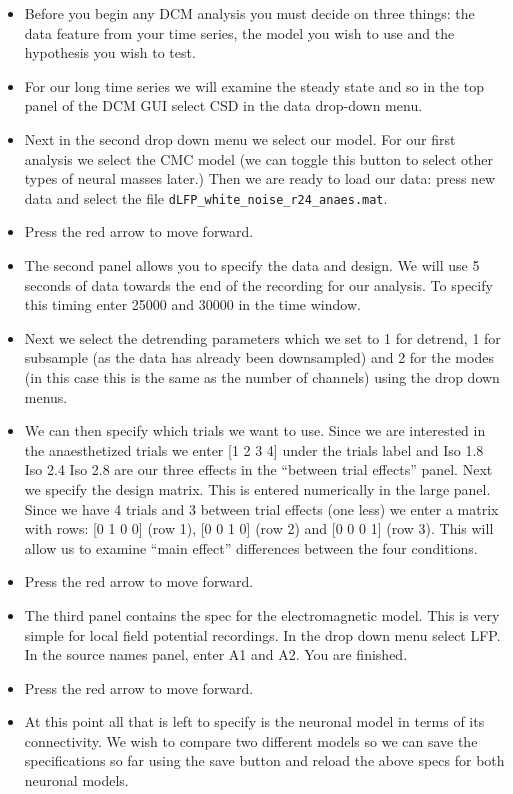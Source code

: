 \begin{itemize}
\item Before you begin any DCM analysis you must decide on three things: the data feature from your time series, the model you wish to use and the hypothesis you wish to test. 
\item For our long time series we will examine the steady state and so in the top panel of the DCM GUI select CSD in the data drop-down menu. 
\item Next in the second drop down menu we select our model. For our first analysis we select the CMC model (we can toggle this button to select other types of neural masses later.) 
Then we are ready to load our data: press new data and select the file \texttt{dLFP\_white\_noise\_r24\_anaes.mat}. 
\item Press the red arrow to move forward. 
\item The second panel allows you to specify the data and design. We will use 5 seconds of data towards the end of the recording for our analysis.  To specify this timing enter 25000 and 30000 in the time window. 
\item Next we select the detrending parameters which we set to 1 for detrend, 1 for subsample (as the data has already been downsampled) and 2 for the modes (in this case this is the same as the number of channels) using the drop down menus. 
\item We can then specify which trials we want to use. Since we are interested in the anaesthetized trials we enter [1 2 3 4] under the trials label and Iso 1.8 Iso 2.4 Iso 2.8 are our three effects in the ``between trial effects'' panel. Next we specify the design matrix. This is entered numerically in the large panel. Since we have 4 trials and 3 between trial effects (one less) we enter a matrix with rows: [0 1 0 0] (row 1), [0 0 1 0] (row 2) and [0 0 0 1] (row 3). This will allow us to examine ``main effect'' differences between the four conditions.
\item Press the red arrow to move forward. 
\item The third panel contains the spec for the electromagnetic model. This is very simple for local field potential recordings. In the drop down menu select LFP. In the source names panel, enter A1 and A2. You are finished. 
\item Press the red arrow to move forward. 
\item At this point all that is left to specify is the neuronal model in terms of its connectivity. We wish to compare two different models so we can save the specifications so far using the save button and reload the above specs for both neuronal models. 

\end{itemize}
